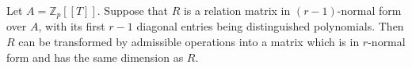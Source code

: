 Let $A = \mathbb{Z}_p[[T]]$. Suppose that $R$ is a relation matrix in $(r-1)$-normal form over $A$, with its first $r-1$ diagonal entries being distinguished polynomials. Then $R$ can be transformed by admissible operations into a matrix which is in $r$-normal form and has the same dimension as $R$.
